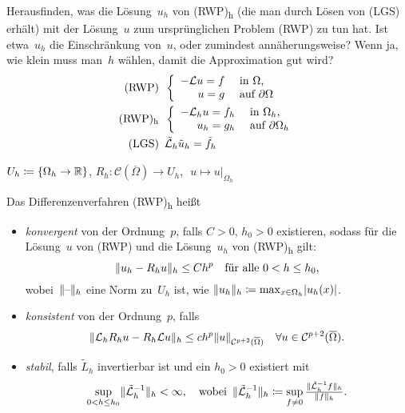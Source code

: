 \documentclass{cheat-sheet}
\newcommand{\Cont}{\mathcal{C}} %
\newcommand{\clos}[1]{\overline{#1}} %
\newcommand{\cOmega}{\clos{\Omega}} %
\newcommand{\LL}{\mathcal{L}} %
\newcommand{\tss}[1]{\textsubscript{#1}} %
\begin{document}
\begin{ziel}
  Herausfinden, was die Lösung~$u_h$ von (RWP)\tss{h} (die man durch Lösen von (LGS) erhält) mit der Lösung~$u$ zum ursprünglichen Problem (RWP) zu tun hat.
  Ist etwa~$u_h$ die Einschränkung von~$u$, oder zumindest annäherungsweise?
  Wenn ja, wie klein muss man~$h$ wählen, damit die Approximation gut wird?
  \begin{align*}
    \text{(RWP)} \enspace & \left\{ \begin{array}{rl}
      - \LL u = f &\text{ in $\Omega$,} \\
      u = g &\text{ auf $\partial \Omega$}
    \end{array} \right. \\
    \text{(RWP)\tss{h}} \enspace & \left\{ \begin{array}{rl}
      - \LL_h u = f_h &\text{ in $\Omega_h$,} \\
      u_h = g_h &\text{ auf $\partial \Omega_h$}
    \end{array} \right. \\
    \text{(LGS)} \enspace & \tilde{\LL}_h \tilde{u}_h = \tilde{f}_h
  \end{align*}
\end{ziel}

\begin{nota}
  $U_h \coloneqq \{ \Omega_h \to \mathbb{R} \}$, \quad
  $R_h : \Cont(\cOmega) \to U_h, \enspace u \mapsto u|_{\Omega_h}$
\end{nota}

\begin{defn}
  Das Differenzenverfahren (RWP)\tss{h} heißt
  \begin{itemize}
    \item \emph{konvergent} von der Ordnung~$p$, falls $C > 0$, $h_0 > 0$ existieren, sodass für die Lösung~$u$ von (RWP) und die Lösung~$u_h$ von (RWP)\tss{h} gilt:
    \[
      \lVert u_h - R_h u\rVert_h \leq C h^p \quad
      \text{für alle $0 < h \leq h_0$,}
    \]
    wobei~$\lVert\text{--}\rVert_h$ eine Norm zu~$U_h$ ist, wie \zB{} $\lVert u_h\rVert_h \coloneqq \max_{x \in \Omega_h} \lvert u_h(x)\rvert$.
    \item \emph{konsistent} von der Ordnung~$p$, falls
    \[
      \norm{\LL_h R_h u - R_h \LL u}_h \leq c h^p \norm{u}_{\Cont^{p+2}(\cOmega)} \quad
      \forall u \in \Cont^{p+2}(\cOmega).
    \]
    \item \emph{stabil}, falls $\tilde{L}_h$ invertierbar ist und ein $h_0 > 0$ existiert mit
    \[
      \sup_{0 < h \leq h_0} \norm{\tilde{\LL}_h^{-1}}_h < \infty, \quad
      \text{wobei} \enspace
      \norm{\tilde{\LL}_h^{-1}}_h \coloneqq \sup_{f \neq 0} \tfrac{\norm{\tilde{\LL}^{-1}_h f}_h}{\norm{f}_h}.
    \]
  \end{itemize}
\end{defn}
\end{document}
